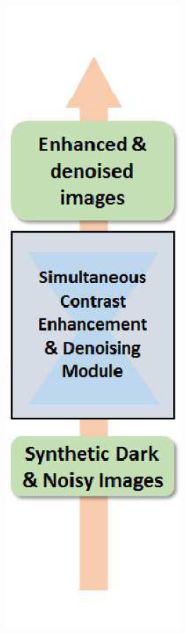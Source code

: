 \documentclass[a4paper]{ctexart}
\begin{document}
\begin{figure}[htb]
\begin{subfigure}{0.18\textwidth}
			\includegraphics[width=\linewidth]{picture/LLIE/LLNet/LLNet}

\end{subfigure}
\end{figure}
\end{document}

